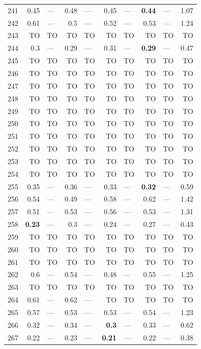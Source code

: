 \begin{longtable}{lr@{\hskip 4pt}l@{\hskip 12pt}r@{\hskip 4pt}l@{\hskip 12pt}r@{\hskip 4pt}l@{\hskip 12pt}r@{\hskip 4pt}l@{\hskip 12pt}r}
241 & 0.45 & --- & 0.48 & --- & 0.45 & --- & \textbf{0.44} & --- & 1.07 \\
242 & 0.61 & --- & 0.5 & --- & 0.52 & --- & 0.53 & --- & 1.24 \\
243 & TO & TO & TO & TO & TO & TO & TO & TO & TO \\
244 & 0.3 & --- & 0.29 & --- & 0.31 & --- & \textbf{0.29} & --- & 0.47 \\
245 & TO & TO & TO & TO & TO & TO & TO & TO & TO \\
246 & TO & TO & TO & TO & TO & TO & TO & TO & TO \\
247 & TO & TO & TO & TO & TO & TO & TO & TO & TO \\
248 & TO & TO & TO & TO & TO & TO & TO & TO & TO \\
249 & TO & TO & TO & TO & TO & TO & TO & TO & TO \\
250 & TO & TO & TO & TO & TO & TO & TO & TO & TO \\
251 & TO & TO & TO & TO & TO & TO & TO & TO & TO \\
252 & TO & TO & TO & TO & TO & TO & TO & TO & TO \\
253 & TO & TO & TO & TO & TO & TO & TO & TO & TO \\
254 & TO & TO & TO & TO & TO & TO & TO & TO & TO \\
255 & 0.35 & --- & 0.36 & --- & 0.33 & --- & \textbf{0.32} & --- & 0.59 \\
256 & 0.54 & --- & 0.49 & --- & 0.58 & --- & 0.62 & --- & 1.42 \\
257 & 0.51 & --- & 0.53 & --- & 0.56 & --- & 0.53 & --- & 1.31 \\
258 & \textbf{0.23} & --- & 0.3 & --- & 0.24 & --- & 0.27 & --- & 0.43 \\
259 & TO & TO & TO & TO & TO & TO & TO & TO & TO \\
260 & TO & TO & TO & TO & TO & TO & TO & TO & TO \\
261 & TO & TO & TO & TO & TO & TO & TO & TO & TO \\
262 & 0.6 & --- & 0.54 & --- & 0.48 & --- & 0.55 & --- & 1.25 \\
263 & TO & TO & TO & TO & TO & TO & TO & TO & TO \\
264 & 0.61 & --- & 0.62 & --- & TO & TO & TO & TO & TO \\
265 & 0.57 & --- & 0.53 & --- & 0.53 & --- & 0.54 & --- & 1.23 \\
266 & 0.32 & --- & 0.34 & --- & \textbf{0.3} & --- & 0.33 & --- & 0.62 \\
267 & 0.22 & --- & 0.23 & --- & \textbf{0.21} & --- & 0.22 & --- & 0.38 \\

\end{longtable}
